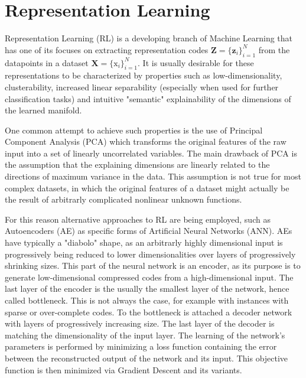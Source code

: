 \section{Representation Learning}
Representation Learning (RL) is a developing branch of Machine Learning that has one of its
focuses on extracting representation codes $\mathbf{Z} = \{\mathbf{z}_i\}_{i=1}^N$ from the datapoints in a dataset $\mathbf{X} = \{\mathrm{x}_i\}_{i=1}^N$.
It is usually desirable for these representations to be characterized by properties such as low-dimensionality, clusterability, increased linear separability (especially when used for further classification tasks) and intuitive "semantic" explainability of the dimensions of the learned manifold.

One common attempt to achieve such properties is the use of Principal Component Analysis (PCA) which transforms the original features of the raw input into a set of linearly uncorrelated variables.
The main drawback of PCA is the assumption that the explaining dimensions are linearly related to the directions of maximum variance in the data.
This assumption is not true for most complex datasets, in which the original features of a dataset might actually be the result of arbitrarly complicated nonlinear unknown functions.

For this reason alternative approaches to RL are being employed, such as Autoencoders (AE) as specific forms of Artificial Neural Networks (ANN).
AEs have typically a "diabolo" shape, as an arbitrarly highly dimensional input is progressively being reduced to lower dimensionalities over layers of progressively shrinking sizes.
This part of the neural network is an encoder, as its purpose is to generate low-dimensional compressed codes from a high-dimensional input.
The last layer of the encoder is the usually the smallest layer of the network, hence called bottleneck.
This is not always the case, for example with instances with sparse or over-complete codes.
To the bottleneck is attached a decoder network with layers of progressively increasing size.
The last layer of the decoder is matching the dimensionality of the input layer.
The learning of the network's parameters is performed by minimizing a loss function containing the error between the reconstructed
output of the network and its input.
This objective function is then minimized via Gradient Descent and its variants.
